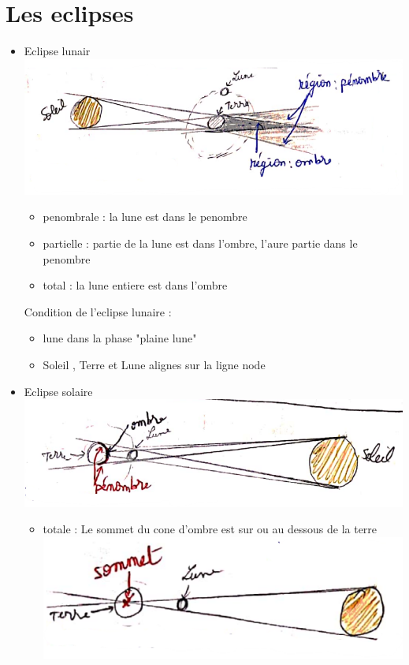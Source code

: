 \documentclass[12pt]{book}
\begin{document}
    \chapter{Les eclipses}
        \begin{itemize}
            \item Eclipse lunair\\
                \includegraphics[width=0.7\linewidth]{pic/lunaireclipse.png}
                \begin{itemize}
                    \item penombrale : la lune est dans le penombre 
                    \item partielle : partie de la lune est dans l'ombre, l'aure partie dans le penombre 
                    \item total : la lune entiere est dans l'ombre
                \end{itemize}
                Condition de l'eclipse lunaire : \begin{itemize}
                    \item lune dans la phase "plaine lune"
                    \item Soleil , Terre et Lune alignes sur la ligne node
                \end{itemize}
            \item Eclipse solaire\\
                \includegraphics[width=0.7\linewidth]{pic/solaireclipse.png}
                \begin{itemize}
                    \item totale : Le sommet du cone d'ombre est sur ou au dessous de la terre 
                        \includegraphics[width=0.3\linewidth]{pic/solareclipstotal.png}

\end{itemize}
\end{itemize}
\end{document}
